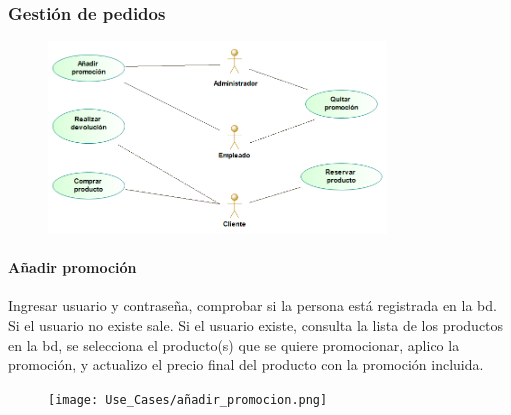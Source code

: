 \subsubsection{Gestión de pedidos}

\begin{figure}[H]
    \centering
    \includegraphics[width=0.8\textwidth]{Use_Cases/gestion de pedidos.png}
\end{figure}
\newpage
\paragraph{Añadir promoción}
Ingresar usuario y contraseña, comprobar si la persona está registrada en la \gls{bd}. Si el usuario no existe sale. Si el usuario existe, consulta la lista de los productos en la \gls{bd}, se selecciona el producto(s) que se quiere promocionar, aplico la promoción, y actualizo el precio final del producto con la promoción incluida.
\begin{figure}[H]
    \centering
    \texttt{[image: Use\_Cases/añadir\_promocion.png]}
\end{figure}
\newpage
